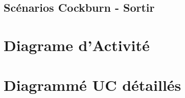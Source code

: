 \newpage    
\subsection{Scénarios Cockburn - Sortir} \label{subsec:sortir}
    

\newpage
\section{Diagrame d'Activité}
    


\newpage
\section{Diagrammé UC détaillés}
    